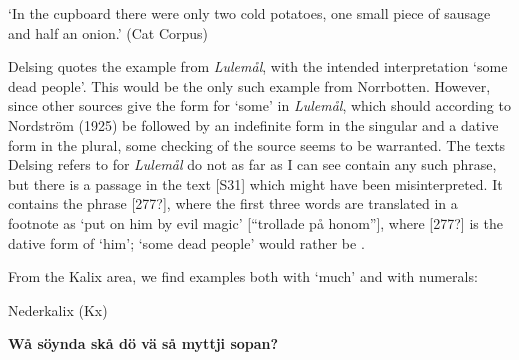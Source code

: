 \glt ‘In the cupboard there were only two cold potatoes, one small piece of sausage and half an onion.’ (Cat Corpus)

\z

Delsing quotes the example from \textit{Lulemål}, with the intended interpretation ‘some dead people’. This would be the only such example from Norrbotten. However, since other sources give the form  for ‘some’ in \textit{Lulemål}, which should according to Nordström (1925) be followed by an indefinite form in the singular and a dative form in the plural, some checking of the source seems to be warranted. The texts Delsing refers to for \textit{Lulemål} do not as far as I can see contain any such phrase, but there is a passage in the text [S31] which might have been misinterpreted. It contains the phrase [277?], where the first three words are translated in a footnote as ‘put on him by evil magic’ [“trollade på honom”], where [277?] is the dative form of ‘him’; ‘some dead people’ would rather be . 


From the Kalix area, we find examples both with ‘much’ and with numerals:


\item 

Nederkalix (Kx) 



\item 


 \ea\label{}\gll\bfseries
Wå  söynda  skå  dö  vä  så  myttji  sopan?\\

